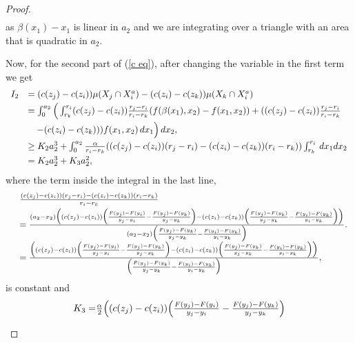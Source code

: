 \documentclass[12pt,reqno]{amsart}
\begin{document}
\begin{proof}
\[\begin{array}{ll}
\end{array}\]
as $\beta(x_1)-x_1$ is linear in $a_2$ and we are integrating over a triangle with an area that is quadratic in $a_2.$  


Now, for the second part of (\ref{c eq}), after changing the variable in the first term we get
\[\begin{array}{ll}
I_2&=(c(z_j)-c(z_i))\mu( X_j\cap X_i^a)-(c(z_i)-c(z_k))\mu( X_k\cap X_i^a)\vspace{3pt}\\

&=\int_0^{a_2}\Big(\int_{r_k}^{r_i}(c(z_j)-c(z_i))\frac{r_j-r_i}{r_i-r_k}(f(\beta(x_1),x_2)-f(x_1,x_2))+((c(z_j)-c(z_i))\frac{r_j-r_i}{r_i-r_k}\vspace{3pt}\\
&\quad -(c(z_i)-c(z_k))) f(x_1,x_2)\,dx_1\Big)\,dx_2,\vspace{3pt}\\
&\geq K_2a_2^3+\int_0^{a_2}\frac{\alpha}{r_i-r_k}((c(z_j)-c(z_i))(r_j-r_i)-(c(z_i)-c(z_k))(r_i-r_k))\int_{r_k}^{r_i}\,dx_1dx_2\vspace{3pt}\\
&=K_2a_2^3+K_3a_2^2,
\end{array}\] 
where the term inside the integral in the last line,
\[\begin{array}{ll}
&\frac{(c(z_j)-c(z_i))(r_j-r_i)-(c(z_i)-c(z_k))(r_i-r_k)}{r_i-r_k}\vspace{3pt}\\
&=\frac{(a_2-x_2)\Big((c(z_j)-c(z_i))\Big(\frac{F(y_j)-F(y_i)}{y_j-y_i}-\frac{F(y_j)-F(y_k)}{y_j-y_k}\Big)-(c(z_i)-c(z_k))\Big(\frac{F(y_j)-F(y_k)}{y_j-y_k}-\frac{F(y_i)-F(y_k)}{y_i-y_k}\Big)\Big)}{(a_2-x_2)\Big(\frac{F(y_j)-F(y_k)}{y_j-y_k}-\frac{F(y_i)-F(y_k)}{y_i-y_k}\Big)}.\\
&=\frac{\Big((c(z_j)-c(z_i))\Big(\frac{F(y_j)-F(y_i)}{y_j-y_i}-\frac{F(y_j)-F(y_k)}{y_j-y_k}\Big)-(c(z_i)-c(z_k))\Big(\frac{F(y_j)-F(y_k)}{y_j-y_k}-\frac{F(y_i)-F(y_k)}{y_i-y_k}\Big)\Big)}{\Big(\frac{F(y_j)-F(y_k)}{y_j-y_k}-\frac{F(y_i)-F(y_k)}{y_i-y_k}\Big)},
\end{array}\]
is constant and  
\[\begin{array}{ll}
K_3=&\hspace{-0.35cm}\frac{\alpha}{2}\Big((c(z_j)-c(z_i))\Big(\frac{F(y_j)-F(y_i)}{y_j-y_i}-\frac{F(y_j)-F(y_k)}{y_j-y_k}\Big)\vspace{3pt}\\

\end{array}\]
\end{proof}
\end{document}
